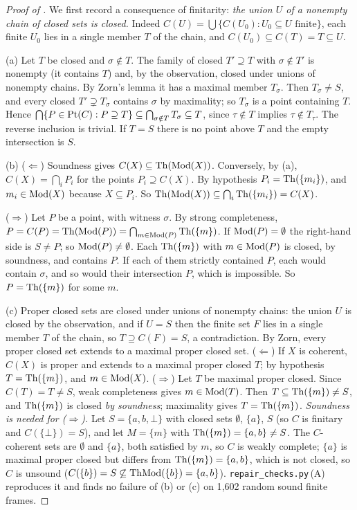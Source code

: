 \begin{proof}[Proof of ]
We first record a consequence of finitarity: \emph{the union $U$ of a nonempty chain of closed sets is closed.} Indeed $C(U)=\bigcup\{C(U_0):U_0\subseteq U\text{ finite}\}$, each finite $U_0$ lies in a single member $T$ of the chain, and $C(U_0)\subseteq C(T)=T\subseteq U$.

(a) Let $T$ be closed and $\sigma\notin T$. The family of closed $T'\supseteq T$ with $\sigma\notin T'$ is nonempty (it contains $T$) and, by the observation, closed under unions of nonempty chains. By Zorn's lemma it has a maximal member $T_\sigma$. Then $T_\sigma\neq S$, and every closed $T'\supsetneq T_\sigma$ contains $\sigma$ by maximality; so $T_\sigma$ is a point containing $T$. Hence $\bigcap\{P\in\mathrm{Pt}(C):P\supseteq T\}\subseteq\bigcap_{\sigma\notin T}T_\sigma\subseteq T$, since $\tau\notin T$ implies $\tau\notin T_\tau$. The reverse inclusion is trivial. If $T=S$ there is no point above $T$ and the empty intersection is $S$.

(b) ($\Leftarrow$) Soundness gives $C(X)\subseteq\mathrm{Th}(\mathrm{Mod}(X))$. Conversely, by (a), $C(X)=\bigcap_iP_i$ for the points $P_i\supseteq C(X)$. By hypothesis $P_i=\mathrm{Th}(\{m_i\})$, and $m_i\in\mathrm{Mod}(X)$ because $X\subseteq P_i$. So $\mathrm{Th}(\mathrm{Mod}(X))\subseteq\bigcap_i\mathrm{Th}(\{m_i\})=C(X)$.

($\Rightarrow$) Let $P$ be a point, with witness $\sigma$. By strong completeness, $P=C(P)=\mathrm{Th}(\mathrm{Mod}(P))=\bigcap_{m\in\mathrm{Mod}(P)}\mathrm{Th}(\{m\})$. If $\mathrm{Mod}(P)=\emptyset$ the right-hand side is $S\neq P$; so $\mathrm{Mod}(P)\neq\emptyset$. Each $\mathrm{Th}(\{m\})$ with $m\in\mathrm{Mod}(P)$ is closed, by soundness, and contains $P$. If each of them strictly contained $P$, each would contain $\sigma$, and so would their intersection $P$, which is impossible. So $P=\mathrm{Th}(\{m\})$ for some $m$.

(c) Proper closed sets are closed under unions of nonempty chains: the union $U$ is closed by the observation, and if $U=S$ then the finite set $F$ lies in a single member $T$ of the chain, so $T\supseteq C(F)=S$, a contradiction. By Zorn, every proper closed set extends to a maximal proper closed set.
($\Leftarrow$) If $X$ is coherent, $C(X)$ is proper and extends to a maximal proper closed $T$; by hypothesis $T=\mathrm{Th}(\{m\})$, and $m\in\mathrm{Mod}(X)$.
($\Rightarrow$) Let $T$ be maximal proper closed. Since $C(T)=T\neq S$, weak completeness gives $m\in\mathrm{Mod}(T)$. Then $T\subseteq\mathrm{Th}(\{m\})\neq S$, and $\mathrm{Th}(\{m\})$ is closed \emph{by soundness}; maximality gives $T=\mathrm{Th}(\{m\})$.
\emph{Soundness is needed for ($\Rightarrow$).} Let $S=\{a,b,\bot\}$ with closed sets $\emptyset$, $\{a\}$, $S$ (so $C$ is finitary and $C(\{\bot\})=S$), and let $M=\{m\}$ with $\mathrm{Th}(\{m\})=\{a,b\}\neq S$. The $C$-coherent sets are $\emptyset$ and $\{a\}$, both satisfied by $m$, so $C$ is weakly complete; $\{a\}$ is maximal proper closed but differs from $\mathrm{Th}(\{m\})=\{a,b\}$, which is not closed, so $C$ is unsound ($C(\{b\})=S\not\subseteq\mathrm{Th}\mathrm{Mod}(\{b\})=\{a,b\}$). \texttt{repair\_checks.py}\,(A) reproduces it and finds no failure of (b) or (c) on 1{,}602 random sound finite frames.
\end{proof}

